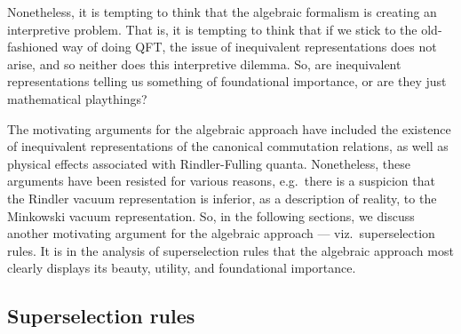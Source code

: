 \documentclass[11pt]{article}
\theoremstyle{definition}
\theoremstyle{definition}
\theoremstyle{remark}
\begin{document}
Nonetheless, it is tempting to think that the algebraic formalism is
creating an interpretive problem.  That is, it is tempting to think
that if we stick to the old-fashioned way of doing QFT, the issue of
inequivalent representations does not arise, and so neither does this
interpretive dilemma.  So, are inequivalent representations telling us
something of foundational importance, or are they just mathematical
playthings?  

The motivating arguments for the algebraic approach have included the
existence of inequivalent representations of the canonical commutation
relations, as well as physical effects associated with Rindler-Fulling
quanta.  Nonetheless, these arguments have been resisted for various
reasons, e.g.\ there is a suspicion that the Rindler vacuum
representation is inferior, as a description of reality, to the
Minkowski vacuum representation.  So, in the following sections, we
discuss another motivating argument for the algebraic approach ---
viz.\ superselection rules.  It is in the analysis of superselection
rules that the algebraic approach most clearly displays its beauty,
utility, and foundational importance.  

\label{sec-DHR}

 \subsection{Superselection rules}
\end{document}
